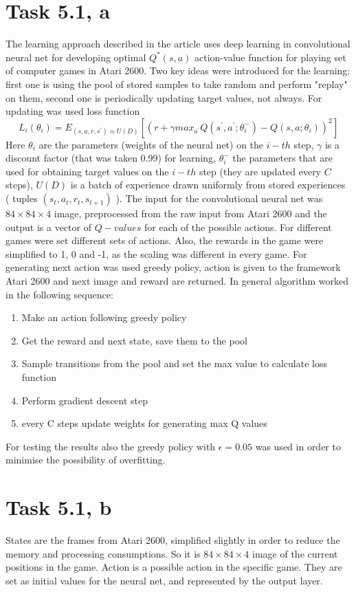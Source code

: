 \documentclass[english]{scrartcl}
\begin{document}
\section*{Task 5.1, a}
The learning approach described in the article uses deep learning in convolutional neural net for developing optimal $Q^{*}(s,a)$ action-value function for playing set of computer games in Atari 2600. Two key ideas were introduced for the learning: first one is using the pool of stored samples to take random and perform "replay" on them, second one is periodically updating target values, not always. For updating was used loss function $$L_{i}(\theta_{i})=E_{(s,a,r,s^{\prime})\approx U(D)}[(r+\gamma max_{a^{\prime}} Q(s^{\prime},a^{\prime};\theta_{i}^{-})-Q(s,a;\theta_{i}))^{2}]$$
Here $\theta_{i}$ are the parameters (weights of the neural net) on the $i-th$ step, $\gamma$ is a discount factor (that was taken 0.99) for learning, $\theta_{i}^{-}$ the parameters that are used for obtaining target values on the $i-th$ step (they are updated every $C$ steps), $U(D)$ is a batch of experience drawn uniformly from stored experiences ( tuples $(s_{t},a_{t},r_{t},s_{t+1})$ ). The input for the convolutional neural net was $84\times84\times4$ image, preprocessed from the raw input from Atari 2600 and the output is a vector of $Q-values$ for each of the possible actions. For different games were set different sets of actions. Also, the rewards in the game were simplified to 1, 0 and -1, as the scaling was different in every game. For generating next action was used greedy policy, action is given to the framework Atari 2600 and next image and reward are returned. In general algorithm worked in the following sequence:
\begin{enumerate}
\item Make an action following greedy policy
\item Get the reward and next state, save them to the pool
\item Sample transitions from the pool and set the max value to calculate loss function
\item Perform gradient descent step
\item every C steps update weights for generating max Q values
\end{enumerate}
For testing the results also the greedy policy with $\epsilon = 0.05$ was used in order to minimise the possibility of overfitting.
\section*{Task 5.1, b}
States are the frames from Atari 2600, simplified slightly in order to reduce the memory and processing consumptions. So it is $84\times84\times4$ image of the current positions in the game. Action is a possible action in the specific game. They are set as initial values for the neural net, and represented by the output layer.
\end{document}
